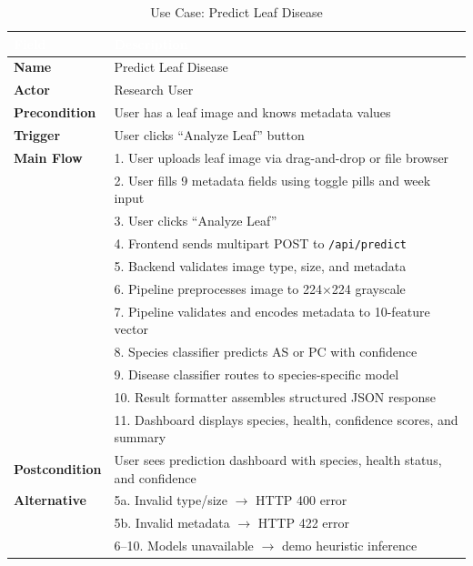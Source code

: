 \documentclass[11pt,a4paper,oneside]{report}
\newcommand{\code}[1]{\texttt{\footnotesize #1}}
\begin{document}
\begin{table}[H]
\centering\footnotesize
\caption{Use Case: Predict Leaf Disease}
\label{tab:uc-predict}
\begin{tabularx}{\textwidth}{>{\bfseries}p{2.2cm} X}
\toprule
\rowcolor{tableheader}
\textcolor{white}{Field} & \textcolor{white}{Description} \\
\midrule
Name            & Predict Leaf Disease \\
Actor           & Research User \\
Precondition    & User has a leaf image and knows metadata values \\
Trigger         & User clicks ``Analyze Leaf'' button \\
Main Flow       & 1. User uploads leaf image via drag-and-drop or file browser \\
                & 2. User fills 9 metadata fields using toggle pills and week input \\
                & 3. User clicks ``Analyze Leaf'' \\
                & 4. Frontend sends multipart POST to \code{/api/predict} \\
                & 5. Backend validates image type, size, and metadata \\
                & 6. Pipeline preprocesses image to 224$\times$224 grayscale \\
                & 7. Pipeline validates and encodes metadata to 10-feature vector \\
                & 8. Species classifier predicts AS or PC with confidence \\
                & 9. Disease classifier routes to species-specific model \\
                & 10. Result formatter assembles structured JSON response \\
                & 11. Dashboard displays species, health, confidence scores, and summary \\
Postcondition   & User sees prediction dashboard with species, health status, and confidence \\
Alternative     & 5a. Invalid type/size $\to$ HTTP 400 error \\
                & 5b. Invalid metadata $\to$ HTTP 422 error \\
                & 6--10. Models unavailable $\to$ demo heuristic inference \\
\bottomrule
\end{tabularx}
\end{table}
\end{document}

